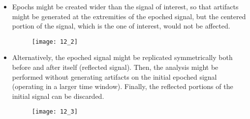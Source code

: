 \begin{itemize}
    \item Epochs might be created wider than the signal of interest, so that
          artifacts might be generated at the extremities of the epoched signal, but the
          centered portion of the signal, which is the one of interest, would not be affected.
          \begin{figure}[H]
              \centering
              \texttt{[image: 12\_2]}
          \end{figure}
    \item Alternatively, the epoched signal might be replicated symmetrically both
          before and after itself (reflected signal). Then, the analysis might be performed
          without generating artifacts on the initial epoched signal (operating in a larger time
          window). Finally, the reflected portions of the initial signal can be discarded.
          \begin{figure}[H]
              \centering
              \texttt{[image: 12\_3]}
          \end{figure}
\end{itemize}
